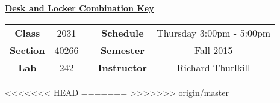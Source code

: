 \documentclass[12pt]{article}
\begin{document}
\thispagestyle{empty}

\begin{center}
	{\huge\textbf{\underline{ Desk and Locker Combination Key}}}
\end{center}


\begin{table}[h]
  \centering
  \begin{tabular}{ccccc}

  \textbf{Class} & 2031 & {\qquad} &\textbf{Schedule} & Thursday 3:00pm - 5:00pm \\
  \textbf{Section} & 40266 & {\qquad} & \textbf{Semester} & Fall 2015 \\
  \textbf{Lab} & 242 & {\qquad} & \textbf{Instructor} & Richard Thurlkill \\
  \end{tabular}
\end{table}
<<<<<<< HEAD
 \vspace{0.1in}
=======
 \vspace{0.5in}
>>>>>>> origin/master
\end{document}
